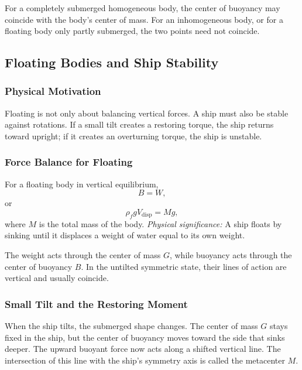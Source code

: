 \documentclass[../main.tex]{subfiles}
\begin{document}
For a completely submerged homogeneous body, the center of buoyancy may coincide with the body's center of mass. For an inhomogeneous body, or for a floating body only partly submerged, the two points need not coincide.

\subsection{Floating Bodies and Ship Stability}\label{sec:lec11:ship-stability}

\subsubsection*{Physical Motivation}
Floating is not only about balancing vertical forces. A ship must also be stable against rotations. If a small tilt creates a restoring torque, the ship returns toward upright; if it creates an overturning torque, the ship is unstable.

\subsubsection{Force Balance for Floating}\label{subsec:lec11:floating-force-balance}
For a floating body in vertical equilibrium,
\begin{equation}
  B=W,
  \label{eq:lec11_float_balance_1}
\end{equation}
or
\begin{equation}
  \boxed{\rho_f g V_{\mathrm{disp}}=Mg,}
  \label{eq:lec11_float_balance}
\end{equation}
where $M$ is the total mass of the body.
\textit{Physical significance:} A ship floats by sinking until it displaces a weight of water equal to its own weight.

The weight acts through the center of mass $G$, while buoyancy acts through the center of buoyancy $B$. In the untilted symmetric state, their lines of action are vertical and usually coincide.

\subsubsection{Small Tilt and the Restoring Moment}\label{subsec:lec11:small-tilt}
When the ship tilts, the submerged shape changes. The center of mass $G$ stays fixed in the ship, but the center of buoyancy moves toward the side that sinks deeper. The upward buoyant force now acts along a shifted vertical line. The intersection of this line with the ship's symmetry axis is called the metacenter $M$.
\end{document}
